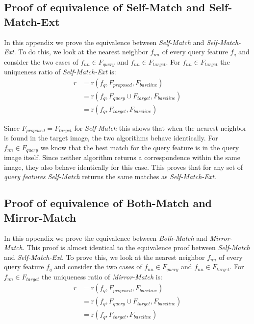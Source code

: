 \documentclass[10pt,journal,cspaper,compsoc]{IEEEtran}
\begin{document}
\appendix

\subsection{Proof of equivalence of Self-Match and Self-Match-Ext}
\label{A:self}

In this appendix we prove the equivalence between \emph{Self-Match} and 
\emph{Self-Match-Ext}. To do this, we look at the nearest neighbor 
$f_{nn}$ of every query feature $f_{q}$ and consider the two cases of 
$f_{nn} \in F_{query}$ and $f_{nn} \in
F_{target}$. For $f_{nn} \in F_{target}$ the uniqueness ratio of 
\emph{Self-Match-Ext} is:
\begin{align*}
    r &= \text{r}(f_{q}, F_{proposed}, F_{baseline}) \\
        &= \text{r}(f_{q}, F_{query} \cup F_{target}, F_{baseline})\\
        &= \text{r}(f_{q}, F_{target}, F_{baseline})
\end{align*}

Since $F_{proposed} = F_{target}$ for \emph{Self-Match} this shows that
when the nearest neighbor is found in the target image, the two 
algorithms behave identically. For $f_{nn} \in F_{query}$ we know that 
the best match for the query feature is in the query image itself. Since 
neither algorithm returns a correspondence within the same image, they 
also behave identically for this case. This proves that for any set of 
\emph{query features} \emph{Self-Match} returns the same matches as 
\emph{Self-Match-Ext}.

\subsection{Proof of equivalence of Both-Match and Mirror-Match}
\label{A:mirror}

In this appendix we prove the equivalence between \emph{Both-Match} and 
\emph{Mirror-Match}. This proof is almost identical to the equivalence 
proof between \emph{Self-Match} and \emph{Self-Match-Ext}. To prove 
this, we look at the nearest neighbor $f_{nn}$ of every query feature 
$f_{q}$ and consider the two cases of $f_{nn} \in F_{query}$ and $f_{nn} 
\in
F_{target}$. For $f_{nn} \in F_{target}$ the uniqueness ratio of 
\emph{Mirror-Match} is:
\begin{align*}
    r &= \text{r}(f_{q}, F_{proposed}, F_{baseline}) \\
        &= \text{r}(f_{q}, F_{query} \cup F_{target}, F_{baseline})\\
        &= \text{r}(f_{q}, F_{target}, F_{baseline})
\end{align*}
\end{document}
